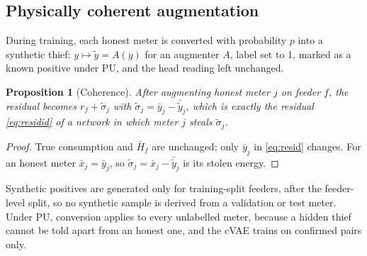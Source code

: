 \documentclass[11pt,a4paper]{article}
\theoremstyle{plain}
\newtheorem{proposition}{Proposition}
\theoremstyle{definition}
\theoremstyle{remark}
\begin{document}
\subsection{Physically coherent augmentation}
During training, each honest meter is converted with probability $p$ into a synthetic thief: $y\mapsto\tilde y=A(y)$ for an augmenter $A$, label set to 1, marked as a known positive under PU, and the head reading left unchanged.
\begin{proposition}[Coherence]
\label{prop:aug}
After augmenting honest meter $j$ on feeder $f$, the residual becomes $r_f+\tilde\sigma_j$ with $\tilde\sigma_j=\bar y_j-\bar{\tilde y}_j$, which is exactly the residual \eqref{eq:residid} of a network in which meter $j$ steals $\tilde\sigma_j$.
\end{proposition}
\begin{proof}
True consumption and $\bar H_f$ are unchanged; only $\bar y_j$ in \eqref{eq:resid} changes. For an honest meter $\bar x_j=\bar y_j$, so $\tilde\sigma_j=\bar x_j-\bar{\tilde y}_j$ is its stolen energy.
\end{proof}
Synthetic positives are generated only for training-split feeders, after the feeder-level split, so no synthetic sample is derived from a validation or test meter. Under PU, conversion applies to every unlabelled meter, because a hidden thief cannot be told apart from an honest one, and the cVAE trains on confirmed pairs only.
\end{document}

